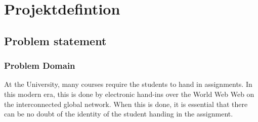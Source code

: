 \documentclass[11pt,a4paper]{article}
\begin{document}

\clearpage\maketitle
\thispagestyle{empty}

\newpage

\section{Projektdefintion}
\subsection{Problem statement}
\subsubsection{Problem Domain}
At the University, many courses require the students to hand in assignments. In this modern era, this is done by electronic hand-ins over the World Web Web on the interconnected global network. When this is done, it is essential that there can be no doubt of the identity of the student handing in the assignment. \\\\
\end{document}
